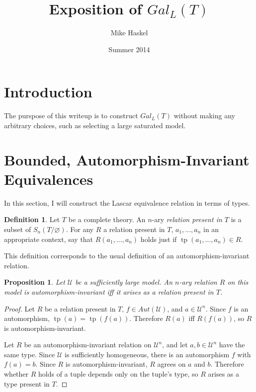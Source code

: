 \documentclass[letterpaper,twoside]{article}
\title{Exposition of \(Gal_L(T)\)}
\author{Mike Haskel}
\date{Summer 2014}
\newtheorem{proposition}[theorem]{Proposition}
\theoremstyle{definition}
\newtheorem{definition}[theorem]{Definition}
\theoremstyle{remark}
\newcommand{\defterm}[1]{\emph{#1}}
\renewcommand{\emptyset}{\varnothing}
\DeclareMathOperator{\tp}{tp}
\begin{document}
\maketitle

\section{Introduction}

The purspose of this writeup is to construct \(Gal_L(T)\) without
making any arbitrary choices, such as selecting a large saturated
model.

\section{Bounded, Automorphism-Invariant Equivalences}

In this section, I will construct the Lascar equivalence relation in
terms of types.

\begin{definition}
  Let \(T\) be a complete theory.  An \(n\)-ary \defterm{relation
    present in \(T\)} is a subset of \(S_n(T/\emptyset)\).  For any
  \(R\) a relation present in \(T\), \(a_1,\ldots,a_n\) in an
  appropriate context, say that \(R(a_1,\ldots,a_n)\) holds just if
  \(\tp(a_1,\ldots,a_n) \in R\).
\end{definition}

This definition corresponds to the usual definition of an
automorphism-invariant relation.

\begin{proposition}
  Let \(\mathcal{U}\) be a sufficiently large model.  An \(n\)-ary
  relation \(R\) on this model is automorphism-invariant iff it arises
  as a relation present in \(T\).
\end{proposition}
\begin{proof}
  Let \(R\) be a relation present in \(T\), \(f \in
  Aut(\mathcal{U})\), and \(a\in \mathcal{U}^n\).  Since \(f\) is an
  automorphism, \(\tp(a) = \tp(f(a))\).  Therefore \(R(a)\) iff
  \(R(f(a))\), so \(R\) is automorphism-invariant.

  Let \(R\) be an automorphism-invariant relation on
  \(\mathcal{U}^n\), and let \(a,b \in \mathcal{U}^n\) have the same
  type.  Since \(\mathcal{U}\) is sufficiently homogeneous, there is
  an automorphism \(f\) with \(f(a) = b\).  Since \(R\) is
  automorphism-invariant, \(R\) agrees on \(a\) and \(b\).  Therefore
  whether \(R\) holds of a tuple depends only on the tuple's type, so
  \(R\) arises as a type present in \(T\).
\end{proof}
\end{document}
